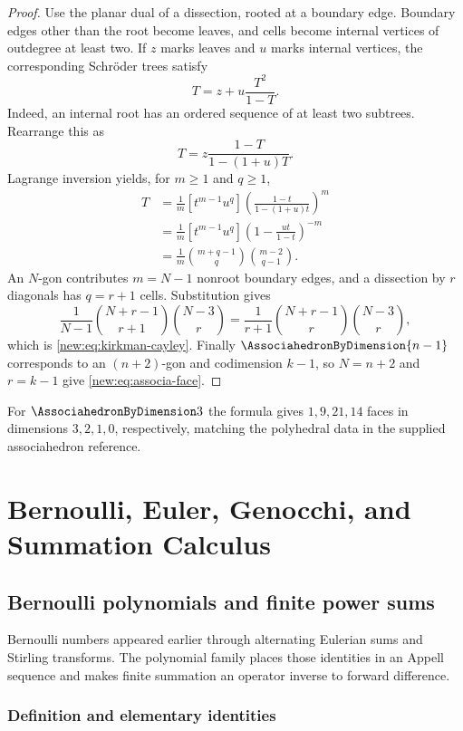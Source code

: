 \documentclass[11pt,a4paper,oneside,openany]{book}
\theoremstyle{definition}
\theoremstyle{remark}
\begin{document}
\begin{proof}
Use the planar dual of a dissection, rooted at a boundary edge.  Boundary edges
other than the root become leaves, and cells become internal vertices of
outdegree at least two.  If $z$ marks leaves and $u$ marks internal vertices,
the corresponding Schr\"oder trees satisfy
\begin{equation}
 T=z+u\frac{T^2}{1-T}.
 \label{new:eq:schroeder-tree}
\end{equation}
Indeed, an internal root has an ordered sequence of at least two subtrees.
Rearrange this as
\[
 T=z\frac{1-T}{1-(1+u)T}.
\]
Lagrange inversion yields, for $m\ge1$ and $q\ge1$,
\begin{align*}
 [z^mu^q]T
 &=\frac1m[t^{m-1}u^q]
   \left(\frac{1-t}{1-(1+u)t}\right)^m\\
 &=\frac1m[t^{m-1}u^q]
   \left(1-\frac{ut}{1-t}\right)^{-m}\\
 &=\frac1m\binom{m+q-1}{q}\binom{m-2}{q-1}.
\end{align*}
An $N$-gon contributes $m=N-1$ nonroot boundary edges, and a dissection by
$r$ diagonals has $q=r+1$ cells.  Substitution gives
\[
 \frac1{N-1}\binom{N+r-1}{r+1}\binom{N-3}{r}
 =\frac1{r+1}\binom{N+r-1}{r}\binom{N-3}{r},
\]
which is \eqref{new:eq:kirkman-cayley}.  Finally $\AssociahedronByDimension{n-1}$ corresponds to an
$(n+2)$-gon and codimension $k-1$, so $N=n+2$ and $r=k-1$ give
\eqref{new:eq:associa-face}.
\end{proof}

For $\AssociahedronByDimension3$ the formula gives $1,9,21,14$ faces in dimensions $3,2,1,0$,
respectively, matching the polyhedral data in the supplied associahedron
reference.


\part{Bernoulli, Euler, Genocchi, and Summation Calculus}

\chapter{Bernoulli polynomials and finite power sums}
\label{ch:bernoulli-polynomials}

Bernoulli numbers appeared earlier through alternating Eulerian sums and
Stirling transforms.  The polynomial family places those identities in an
Appell sequence and makes finite summation an operator inverse to forward
difference.

\section{Definition and elementary identities}
\end{document}
